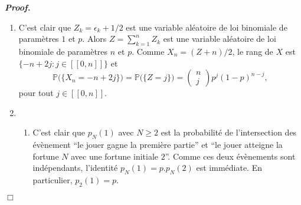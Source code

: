 \documentclass[11pt,a4paper]{article}
\newenvironment{preuve}[1][]
{\vskip 2mm  \noindent\emph{\bf Proof#1. }}{$\Box$ \vskip 2mm}
\let\geq\geqslant
\begin{document}
		\begin{preuve}
			\begin{enumerate}
				\item C'est clair que $Z_k=\epsilon_k+1/2$ est une variable aléatoire de loi binomiale de paramètres $1$ et $p$. 
				Alors $Z = \sum_{k=1}^{n} Z_{k}$ est une variable aléatoire de loi binomiale de paramètres $n$ et $p$. 
				Comme $X_{n} = (Z+n)/2$, le rang de $X$ est $\{ -n+2j : j \in [\![ 0, n ]\!] \}$ et 
				\[     \mathbb{P}\big(\{X_{n} = -n+2j \}\big) = \mathbb{P}\big(\{Z = j \}\big) = \begin{pmatrix} n \\ j \end{pmatrix} p^{j} (1-p)^{n-j},     \]
				pour tout $j \in [\![ 0, n ]\!]$. 
				
				\item 
				\begin{enumerate}[label=(\roman*)]
					\item C'est clair que $p_N(1)$ avec $N\geq 2$ est la probabilité de l'intersection des évènement ``le jouer gagne la première partie'' et ``le jouer atteigne la fortune $N$ avec une fortune initiale $2$''. 
					Comme ces deux évènements sont indépendants, l'identité $p_N(1)=p.p_N(2)$ est immédiate. 
					En particulier, $p_{2}(1) = p$. 
					

\end{enumerate}
\end{enumerate}
\end{preuve}
\end{document}
